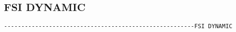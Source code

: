 \subsection{FSI DYNAMIC}
\begin{verbatim}
-------------------------------------------------------FSI DYNAMIC
\end{verbatim}
















